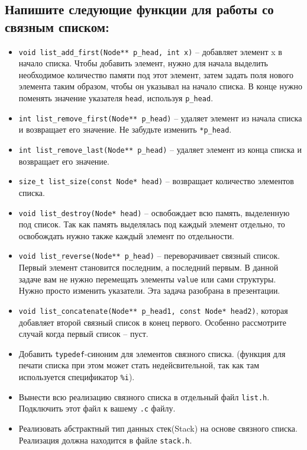 \documentclass{article}
\begin{document}
\subsection*{Напишите следующие функции для работы со связным списком:}
\begin{itemize}
\item \texttt{void list\_add\_first(Node** p\_head, int x)} -- добавляет элемент x в начало списка. Чтобы добавить элемент, нужно для начала выделить необходимое количество памяти под этот элемент, затем задать поля нового элемента таким образом, чтобы он указывал на начало списка. В конце нужно поменять значение указателя \texttt{head}, используя \texttt{p\_head}.
\item \texttt{int list\_remove\_first(Node** p\_head)} -- удаляет элемент из начала списка и возвращает его значение. Не забудьте изменить \texttt{*p\_head}.

\item \texttt{int list\_remove\_last(Node** p\_head)} -- удаляет элемент из конца списка и возвращает его значение. 
\item \texttt{size\_t list\_size(const Node* head)} -- возвращает количество элементов списка.
\item \texttt{void list\_destroy(Node* head)} -- освобождает всю память, выделенную под список. Так как память выделялась под каждый элемент отдельно, то освобождать нужно также каждый элемент по отдельности.

\item \texttt{void list\_reverse(Node** p\_head)} -- переворачивает связный список. Первый элемент становится последним, а последний первым. В данной задаче вам не нужно перемещать элементы \texttt{value} или сами структуры. Нужно просто изменить указатели. Эта задача разобрана в презентации.

\item \texttt{void list\_concatenate(Node** p\_head1, const Node* head2)}, которая добавляет второй связный список в конец первого. Особенно рассмотрите случай когда первый список -- пуст.


\item Добавить \texttt{typedef}-синоним для элементов связного списка. (функция для печати списка при этом может стать недейсвительной, так как там используется спецификатор \texttt{\%i}).
\item Вынести всю реализацию связного списка в отдельный файл \texttt{list.h}. Подключить этот файл к вашему \texttt{.c} файлу.
\item Реализовать абстрактный тип данных стек(Stack) на основе связного списка. Реализация должна находится в файле \texttt{stack.h}.
\end{itemize}
\end{document}
